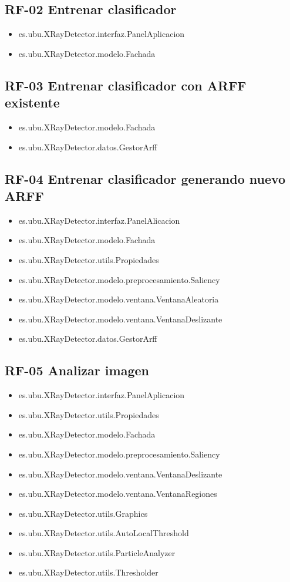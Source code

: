 \subsection{RF-02 Entrenar clasificador}
\begin{itemize}
\item[] es.ubu.XRayDetector.interfaz.PanelAplicacion
\item[] es.ubu.XRayDetector.modelo.Fachada
\end{itemize}

\subsection{RF-03 Entrenar clasificador con ARFF existente}
\begin{itemize}
\item[] es.ubu.XRayDetector.modelo.Fachada
\item[] es.ubu.XRayDetector.datos.GestorArff
\end{itemize}

\subsection{RF-04 Entrenar clasificador generando nuevo ARFF}
\begin{itemize}
\item[] es.ubu.XRayDetector.interfaz.PanelAlicacion
\item[] es.ubu.XRayDetector.modelo.Fachada
\item[] es.ubu.XRayDetector.utils.Propiedades
\item[] es.ubu.XRayDetector.modelo.preprocesamiento.Saliency
\item[] es.ubu.XRayDetector.modelo.ventana.VentanaAleatoria
\item[] es.ubu.XRayDetector.modelo.ventana.VentanaDeslizante
\item[] es.ubu.XRayDetector.datos.GestorArff
\end{itemize}

\subsection{RF-05 Analizar imagen}
\begin{itemize}
\item[] es.ubu.XRayDetector.interfaz.PanelAplicacion
\item[] es.ubu.XRayDetector.utils.Propiedades
\item[] es.ubu.XRayDetector.modelo.Fachada
\item[] es.ubu.XRayDetector.modelo.preprocesamiento.Saliency
\item[] es.ubu.XRayDetector.modelo.ventana.VentanaDeslizante
\item[] es.ubu.XRayDetector.modelo.ventana.VentanaRegiones
\item[] es.ubu.XRayDetector.utils.Graphics
\item[] es.ubu.XRayDetector.utils.AutoLocalThreshold
\item[] es.ubu.XRayDetector.utils.ParticleAnalyzer
\item[] es.ubu.XRayDetector.utils.Thresholder
\end{itemize}

